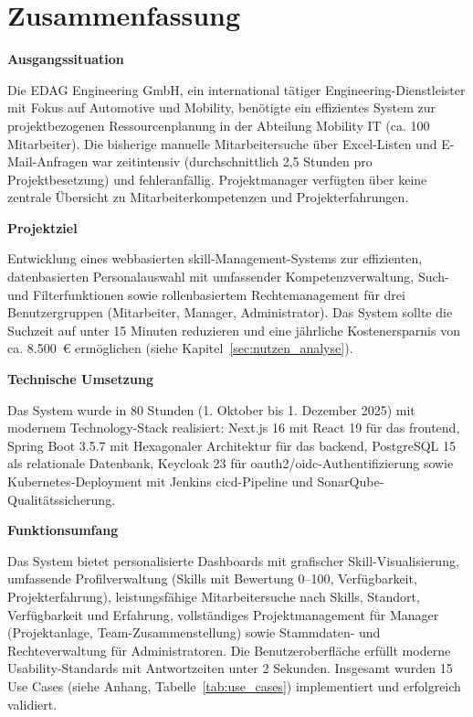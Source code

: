 \chapter*{Zusammenfassung}

\textbf{Ausgangssituation}

Die EDAG Engineering GmbH, ein international tätiger Engineering-Dienstleister mit Fokus auf Automotive und Mobility, benötigte ein effizientes System zur projektbezogenen Ressourcenplanung in der Abteilung Mobility IT (ca. 100 Mitarbeiter). Die bisherige manuelle Mitarbeitersuche über Excel-Listen und E-Mail-Anfragen war zeitintensiv (durchschnittlich 2,5 Stunden pro Projektbesetzung) und fehleranfällig. Projektmanager verfügten über keine zentrale Übersicht zu Mitarbeiterkompetenzen und Projekterfahrungen\cite{projektbesetzung_aufwand}.

\textbf{Projektziel}

Entwicklung eines webbasierten \gls{skill}-Management-Systems zur effizienten, datenbasierten Personalauswahl mit umfassender Kompetenzverwaltung, Such- und Filterfunktionen sowie rollenbasiertem Rechtemanagement für drei Benutzergruppen (Mitarbeiter, Manager, Administrator). Das System sollte die Suchzeit auf unter 15 Minuten reduzieren und eine jährliche Kostenersparnis von ca. 8.500~€ ermöglichen (siehe Kapitel~\ref{sec:nutzen_analyse}).

\textbf{Technische Umsetzung}

Das System wurde in 80 Stunden (1. Oktober bis 1. Dezember 2025) mit modernem Technology-Stack realisiert: Next.js 16 mit React 19 für das \gls{frontend}\cite{nextjs_docs,react_docs}, Spring Boot 3.5.7 mit Hexagonaler Architektur für das \gls{backend}\cite{spring_boot_docs}, PostgreSQL 15 als relationale Datenbank\cite{postgresql_docs}, Keycloak 23 für \gls{oauth}2/\gls{oidc}-Authentifizierung\cite{keycloak_docs} sowie Kubernetes-Deployment\cite{kubernetes_docs} mit Jenkins \gls{cicd}-Pipeline und SonarQube-Qualitätssicherung\cite{jenkins_docs,sonarqube_docs}.

\textbf{Funktionsumfang}

Das System bietet personalisierte Dashboards mit grafischer Skill-Visualisierung, umfassende Profilverwaltung (Skills mit Bewertung 0--100, Verfügbarkeit, Projekterfahrung), leistungsfähige Mitarbeitersuche nach Skills, Standort, Verfügbarkeit und Erfahrung, vollständiges Projektmanagement für Manager (Projektanlage, Team-Zusammenstellung) sowie Stammdaten- und Rechteverwaltung für Administratoren. Die Benutzeroberfläche erfüllt moderne Usability-Standards mit Antwortzeiten unter 2 Sekunden\cite{iso_standard}. Insgesamt wurden 15 Use Cases (siehe Anhang, Tabelle~\ref{tab:use_cases}) implementiert und erfolgreich validiert.


